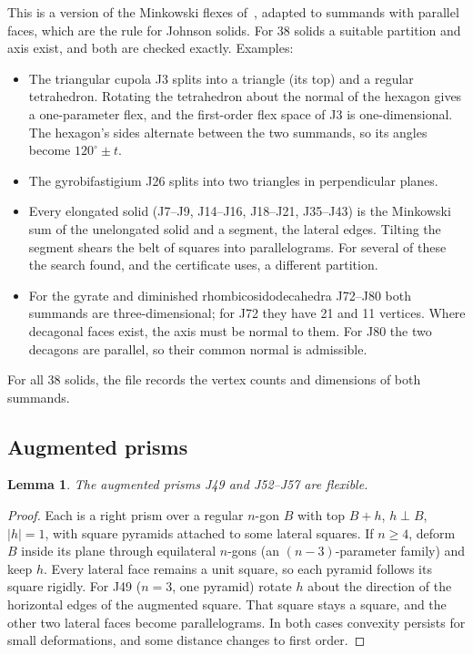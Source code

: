 \documentclass[11pt]{amsart}
\newtheorem{lemma}[theorem]{Lemma}
\theoremstyle{remark}
\begin{document}
This is a version of the Minkowski flexes of~\cite[Sec.~4.1]{HSW2026}, adapted to summands with parallel faces, which are the rule for Johnson solids. For 38 solids a suitable partition and axis exist, and both are checked exactly. Examples:
\begin{itemize}
\item The triangular cupola J3 splits into a triangle (its top) and a regular tetrahedron. Rotating the tetrahedron about the normal of the hexagon gives a one-parameter flex, and the first-order flex space of J3 is one-dimensional. The hexagon's sides alternate between the two summands, so its angles become $120^\circ\pm t$.
\item The gyrobifastigium J26 splits into two triangles in perpendicular planes.
\item Every elongated solid (J7--J9, J14--J16, J18--J21, J35--J43) is the Minkowski sum of the unelongated solid and a segment, the lateral edges. Tilting the segment shears the belt of squares into parallelograms. For several of these the search found, and the certificate uses, a different partition.
\item For the gyrate and diminished rhombicosidodecahedra J72--J80 both summands are three-dimensional; for J72 they have 21 and 11 vertices. Where decagonal faces exist, the axis must be normal to them. For J80 the two decagons are parallel, so their common normal is admissible.
\end{itemize}
For all 38 solids, the file  records the vertex counts and dimensions of both summands.

\subsection{Augmented prisms}
\begin{lemma}\label{lem:prism}
The augmented prisms J49 and J52--J57 are flexible.
\end{lemma}

\begin{proof}
Each is a right prism over a regular $n$-gon $B$ with top $B+h$, $h\perp B$, $|h|=1$, with square pyramids attached to some lateral squares. If $n\ge4$, deform $B$ inside its plane through equilateral $n$-gons (an $(n-3)$-parameter family) and keep $h$. Every lateral face remains a unit square, so each pyramid follows its square rigidly. For J49 ($n=3$, one pyramid) rotate $h$ about the direction of the horizontal edges of the augmented square. That square stays a square, and the other two lateral faces become parallelograms. In both cases convexity persists for small deformations, and some distance changes to first order.
\end{proof}
\end{document}
